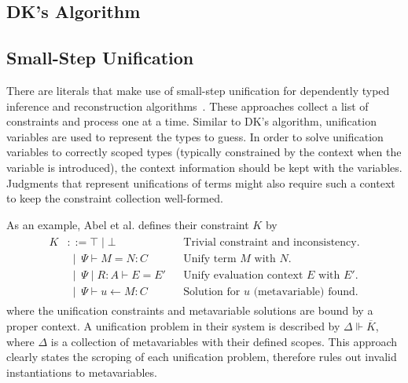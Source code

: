 \subsection{DK's Algorithm}

\subsection{Small-Step Unification}
There are literals that make use of small-step unification for dependently typed
inference and reconstruction algorithms~\cite{Reed2009,Abel2011higher}.
These approaches collect a list of constraints and process one at a time.
Similar to DK's algorithm, unification variables are used to represent the types to guess.
In order to solve unification variables to correctly scoped types
(typically constrained by the context when the variable is introduced),
the context information should be kept with the variables.
Judgments that represent unifications of terms might also require such a context
to keep the constraint collection well-formed.

As an example, Abel et al. defines their constraint $K$ by
\begin{gather*}
\begin{aligned}
K &::= {\top} \mid {\bot} &&\text{Trivial constraint and inconsistency.}\\
    & \ \mid \  \Psi\vdash M = N : C &&\text{Unify term $M$ with $N$.}\\
    & \ \mid \  \Psi\mid R:A \vdash E = E' &&\text{Unify evaluation context $E$ with $E'$.}\\
    & \ \mid \  \Psi\vdash u\leftarrow M: C &&\text{Solution for $u$ (metavariable) found.}
\end{aligned}
\end{gather*}
where the unification constraints and metavariable solutions are bound by a proper context.
A unification problem in their system is described by $\Delta \Vdash \overline{K}$,
where $\Delta$ is a collection of metavariables with their defined scopes.
This approach clearly states the scroping of each unification problem,
therefore rules out invalid instantiations to metavariables.


